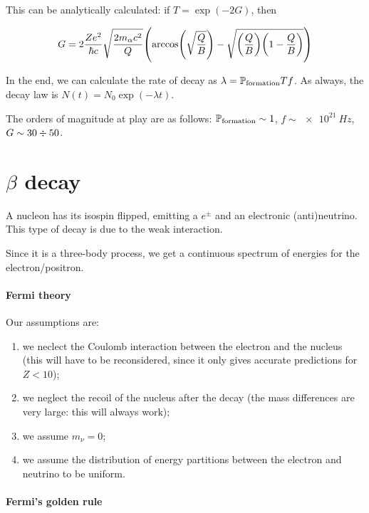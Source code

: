 \documentclass{article}
\begin{document}
This can be analytically calculated: if \(T = \exp(-2G) \), then

\begin{equation}
G = 2 \frac{Ze^2}{\hbar c} \sqrt{\frac{2m_\alpha c^2}{Q}}
\qty(\arccos(\sqrt{\frac{Q}{B}} ) - \sqrt{\qty(\frac{Q}{B}) \qty(1 - \frac{Q}{B})} )
\end{equation}

In the end, we can calculate the rate of decay as \(\lambda = \P _ \text{formation} T f\). As always, the decay law is \(N(t) = N_0 \exp(-\lambda t) \).

The orders of magnitude at play are as follows: \(\P _{\text{formation}} \sim 1 \), \(f \sim \SI{e21}{Hz} \), \(G \sim 30 \divisionsymbol 50\).

\section{\(\beta\) decay}

A nucleon has its isospin flipped, emitting a \(e^{\pm}\) and an electronic (anti)neutrino. This type of decay is due to the weak interaction.

Since it is a three-body process, we get a continuous spectrum of energies for the electron/positron.

\paragraph{Fermi theory}

Our assumptions are:

\begin{enumerate}
    \item we neclect the Coulomb interaction between the electron and the nucleus (this will have to be reconsidered, since it only gives accurate predictions for \(Z<10\));
    \item we neglect the recoil of the nucleus after the decay (the mass differences are very large: this will always work);
    \item we assume \(m_\nu = 0\); \label{item:beta-null-mass-assumption}
    \item we assume the distribution of energy partitions between the electron and neutrino to be uniform.
\end{enumerate}

\paragraph{Fermi's golden rule}
\end{document}
